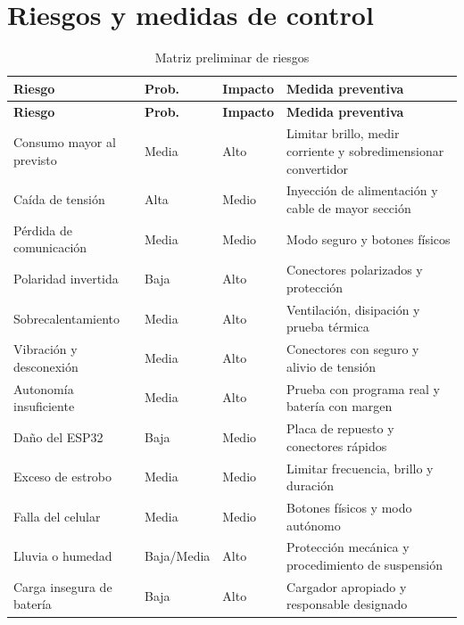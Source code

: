 \documentclass[11pt,a4paper]{article}
\begin{document}
\section{Riesgos y medidas de control}
\begin{longtable}{@{}P{4.0cm}P{1.8cm}P{1.8cm}P{6.3cm}@{}}
\caption{Matriz preliminar de riesgos}\\
\toprule
\textbf{Riesgo} & \textbf{Prob.} & \textbf{Impacto} & \textbf{Medida preventiva}\\
\midrule
\endfirsthead
\toprule
\textbf{Riesgo} & \textbf{Prob.} & \textbf{Impacto} & \textbf{Medida preventiva}\\
\midrule
\endhead
Consumo mayor al previsto & Media & Alto & Limitar brillo, medir corriente y sobredimensionar convertidor\\
Caída de tensión & Alta & Medio & Inyección de alimentación y cable de mayor sección\\
Pérdida de comunicación & Media & Medio & Modo seguro y botones físicos\\
Polaridad invertida & Baja & Alto & Conectores polarizados y protección\\
Sobrecalentamiento & Media & Alto & Ventilación, disipación y prueba térmica\\
Vibración y desconexión & Media & Alto & Conectores con seguro y alivio de tensión\\
Autonomía insuficiente & Media & Alto & Prueba con programa real y batería con margen\\
Daño del ESP32 & Baja & Medio & Placa de repuesto y conectores rápidos\\
Exceso de estrobo & Media & Medio & Limitar frecuencia, brillo y duración\\
Falla del celular & Media & Medio & Botones físicos y modo autónomo\\
Lluvia o humedad & Baja/Media & Alto & Protección mecánica y procedimiento de suspensión\\
Carga insegura de batería & Baja & Alto & Cargador apropiado y responsable designado\\
\bottomrule
\end{longtable}

\end{document}
